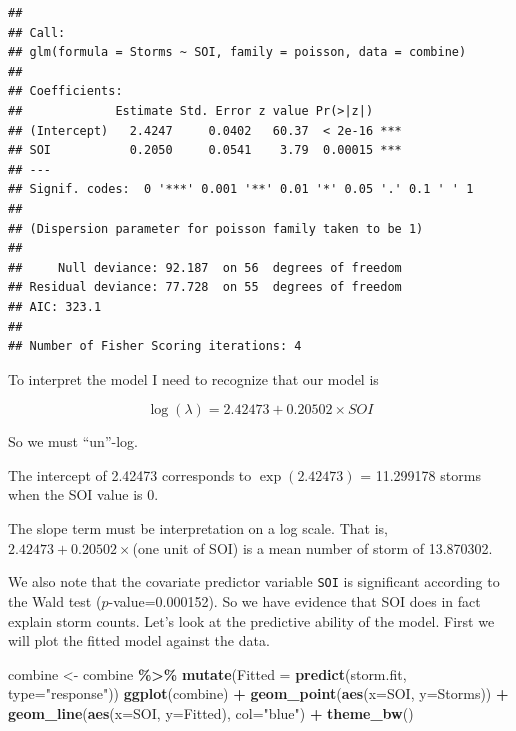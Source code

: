\documentclass[
]{book}
\newenvironment{Shaded}{\begin{snugshade}}{\end{snugshade}}
\newcommand{\AttributeTok}[1]{\textcolor[rgb]{0.13,0.29,0.53}{#1}}
\newcommand{\FunctionTok}[1]{\textcolor[rgb]{0.13,0.29,0.53}{\textbf{#1}}}
\newcommand{\NormalTok}[1]{#1}
\newcommand{\OtherTok}[1]{\textcolor[rgb]{0.56,0.35,0.01}{#1}}
\newcommand{\SpecialCharTok}[1]{\textcolor[rgb]{0.81,0.36,0.00}{\textbf{#1}}}
\newcommand{\StringTok}[1]{\textcolor[rgb]{0.31,0.60,0.02}{#1}}
\begin{document}
\begin{verbatim}
## 
## Call:
## glm(formula = Storms ~ SOI, family = poisson, data = combine)
## 
## Coefficients:
##             Estimate Std. Error z value Pr(>|z|)    
## (Intercept)   2.4247     0.0402   60.37  < 2e-16 ***
## SOI           0.2050     0.0541    3.79  0.00015 ***
## ---
## Signif. codes:  0 '***' 0.001 '**' 0.01 '*' 0.05 '.' 0.1 ' ' 1
## 
## (Dispersion parameter for poisson family taken to be 1)
## 
##     Null deviance: 92.187  on 56  degrees of freedom
## Residual deviance: 77.728  on 55  degrees of freedom
## AIC: 323.1
## 
## Number of Fisher Scoring iterations: 4
\end{verbatim}

To interpret the model I need to recognize that our model is

\[\log(\lambda) = 2.42473 + 0.20502\times SOI\]

So we must ``un''-log.

The intercept of 2.42473 corresponds to \(\exp(2.42473)\) = 11.299178 storms when the SOI value is 0.

The slope term must be interpretation on a log scale. That is, \(2.42473+0.20502\times\)(one unit of SOI) is a mean number of storm of 13.870302.

We also note that the covariate predictor variable \texttt{SOI} is significant according to the Wald test (\(p\)-value=0.000152). So we have evidence that SOI does in fact explain storm counts. Let's look at the predictive ability of the model. First we will plot the fitted model against the data.

\begin{Shaded}
\begin{Highlighting}[]
\NormalTok{combine }\OtherTok{\textless{}{-}}\NormalTok{ combine }\SpecialCharTok{\%\textgreater{}\%}
  \FunctionTok{mutate}\NormalTok{(}\AttributeTok{Fitted =} \FunctionTok{predict}\NormalTok{(storm.fit, }\AttributeTok{type=}\StringTok{"response"}\NormalTok{))}
\FunctionTok{ggplot}\NormalTok{(combine) }\SpecialCharTok{+} 
  \FunctionTok{geom\_point}\NormalTok{(}\FunctionTok{aes}\NormalTok{(}\AttributeTok{x=}\NormalTok{SOI, }\AttributeTok{y=}\NormalTok{Storms)) }\SpecialCharTok{+} 
  \FunctionTok{geom\_line}\NormalTok{(}\FunctionTok{aes}\NormalTok{(}\AttributeTok{x=}\NormalTok{SOI, }\AttributeTok{y=}\NormalTok{Fitted), }\AttributeTok{col=}\StringTok{"blue"}\NormalTok{) }\SpecialCharTok{+}
  \FunctionTok{theme\_bw}\NormalTok{()}
\end{Highlighting}
\end{Shaded}
\end{document}
